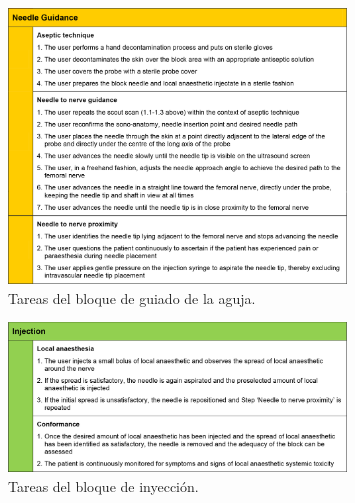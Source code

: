  \begin{figure}[tbhp]
  \centering
    \includegraphics[width=0.8\textwidth]{IMG/needleguidance.png}
    \caption{Tareas del bloque de guiado de la aguja. }
  \label{fig:needleguidance}
\end{figure}

 \begin{figure}[th]
  \centering
    \includegraphics[width=0.8\textwidth]{IMG/injection.png}
    \caption{ Tareas del bloque de inyección.}
  \label{fig:injection}
\end{figure}


